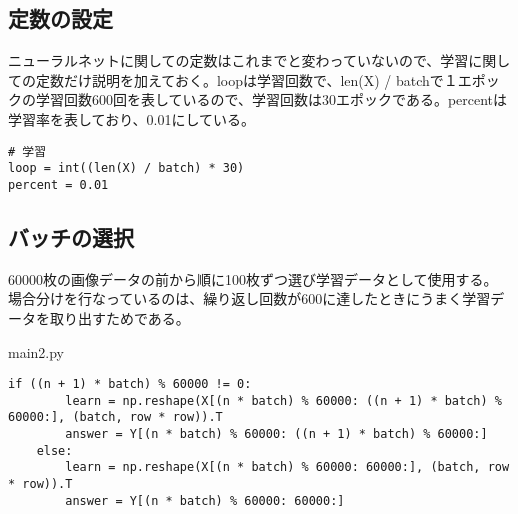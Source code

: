 \documentclass{ujarticle}
\begin{document}
\subsection{定数の設定}
ニューラルネットに関しての定数はこれまでと変わっていないので、学習に関しての定数だけ説明を加えておく。loopは学習回数で、len(X) / batchで１エポックの学習回数600回を表しているので、学習回数は30エポックである。percentは学習率を表しており、0.01にしている。
\begin{lstlisting}[basicstyle=\ttfamily\footnotesize, frame=single]
# 学習
loop = int((len(X) / batch) * 30)
percent = 0.01
\end{lstlisting}

\subsection{バッチの選択}
60000枚の画像データの前から順に100枚ずつ選び学習データとして使用する。
場合分けを行なっているのは、繰り返し回数が600に達したときにうまく学習データを取り出すためである。

main2.py
\begin{lstlisting}[basicstyle=\ttfamily\footnotesize, frame=single]
    if ((n + 1) * batch) % 60000 != 0:
        learn = np.reshape(X[(n * batch) % 60000: ((n + 1) * batch) % 60000:], (batch, row * row)).T
        answer = Y[(n * batch) % 60000: ((n + 1) * batch) % 60000:]
    else:
        learn = np.reshape(X[(n * batch) % 60000: 60000:], (batch, row * row)).T
        answer = Y[(n * batch) % 60000: 60000:]
\end{lstlisting}
\end{document}
